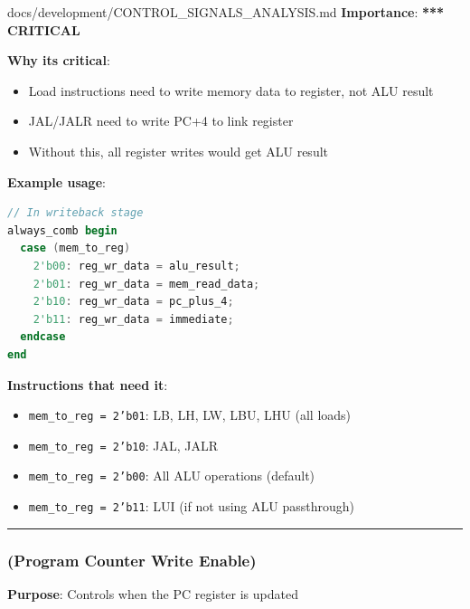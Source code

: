 \begin{relocated}{docs/development/CONTROL_SIGNALS_ANALYSIS.md}
\textbf{Importance}: \textbf{*}\textbf{*}\textbf{*} \textbf{CRITICAL}

\textbf{Why it\textquotesingle s critical}:

\begin{itemize}
\tightlist
\item
  Load instructions need to write memory data to register, not ALU
  result
\item
  JAL/JALR need to write PC+4 to link register
\item
  Without this, all register writes would get ALU result
\end{itemize}

\textbf{Example usage}:

\begin{lstlisting}[language=Verilog]
// In writeback stage
always_comb begin
  case (mem_to_reg)
    2'b00: reg_wr_data = alu_result;
    2'b01: reg_wr_data = mem_read_data;
    2'b10: reg_wr_data = pc_plus_4;
    2'b11: reg_wr_data = immediate;
  endcase
end
\end{lstlisting}

\textbf{Instructions that need it}:

\begin{itemize}
\tightlist
\item
  \texttt{mem\_\allowbreak{}to\_\allowbreak{}reg\ =\allowbreak{}\ 2'b01}:
  LB, LH, LW, LBU, LHU (all loads)
\item
  \texttt{mem\_\allowbreak{}to\_\allowbreak{}reg\ =\allowbreak{}\ 2'b10}:
  JAL, JALR
\item
  \texttt{mem\_\allowbreak{}to\_\allowbreak{}reg\ =\allowbreak{}\ 2'b00}:
  All ALU operations (default)
\item
  \texttt{mem\_\allowbreak{}to\_\allowbreak{}reg\ =\allowbreak{}\ 2'b11}:
  LUI (if not using ALU passthrough)
\end{itemize}

\begin{center}\rule{0.5\linewidth}{0.5pt}\end{center}

\subsubsection{\texorpdfstring{ (Program Counter Write
Enable)}{(Program Counter Write Enable)}}\label{tm:flow:control-signals-analysis:2-pc-wr-en-program-counter-write-enable}

\textbf{Purpose}: Controls when the PC register is updated


\end{relocated}
